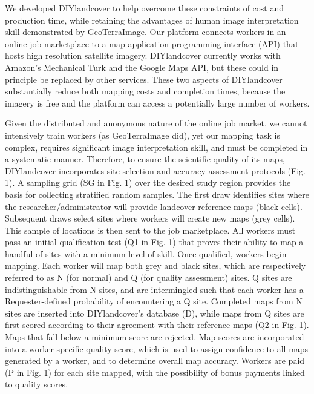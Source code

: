\documentclass[preprint,12pt,authoryear]{elsarticle}
\begin{document}
We developed DIYlandcover to help overcome these constraints of cost and production time, while retaining the advantages of human image interpretation skill demonstrated by GeoTerraImage. Our platform connects workers in an online job marketplace to a map application programming interface (API) that hosts high resolution satellite imagery. DIYlandcover currently works with Amazon's Mechanical Turk \citep{amazon_web_services_amazon_2012} and the Google Maps API, but these could in principle be replaced by other services. These two aspects of DIYlandcover substantially reduce both mapping costs and completion times, because the imagery is free and the platform can access a potentially large number of workers. 

Given the distributed and anonymous nature of the online job market, we cannot intensively train workers (as GeoTerraImage did), yet our mapping task is complex, requires significant image interpretation skill, and must be completed in a systematic manner. Therefore, to ensure the scientific quality of its maps, DIYlandcover incorporates site selection and accuracy assessment protocols (Fig. 1). A sampling grid (SG in Fig. 1) over the desired study region provides the basis for collecting stratified random samples. The first draw identifies sites where the researcher/administrator \citep[the ``Requester'';][]{allahbakhsh_quality_2013} will provide landcover reference maps (black cells). Subsequent draws select sites where workers will create new maps (grey cells). This sample of locations is then sent to the job marketplace. All workers must pass an initial qualification test (Q1 in Fig. 1) that proves their ability to map a handful of sites with a minimum level of skill. Once qualified, workers begin mapping. Each worker will map both grey and black sites, which are respectively referred to as N (for normal) and Q (for quality assessment) sites. Q sites are indistinguishable from N sites, and are intermingled such that each worker has a Requester-defined probability of encountering a Q site. Completed maps from N sites are inserted into DIYlandcover's database (D), while maps from Q sites are first scored according to their agreement with their reference maps (Q2 in Fig. 1). Maps that fall below a minimum score are rejected. Map scores are incorporated into a worker-specific quality score, which is used to assign confidence to all maps generated by a worker, and to determine overall map accuracy. Workers are paid (P in Fig. 1) for each site mapped, with the possibility of bonus payments linked to quality scores.    
\end{document}
